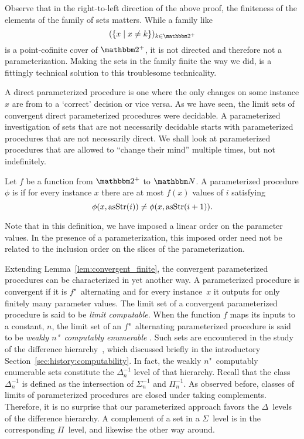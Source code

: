 Observe that in the right-to-left direction of the above proof, the finiteness of the elements of the family of sets matters.
While a family like
\begin{equation*}
  (\{x \st x \neq k\})_{k \in \binary^+}
\end{equation*}
is a point-cofinite cover of $\binary^+$, it is not directed and therefore not a parameterization.
Making the sets in the family finite the way we did, is a fittingly technical solution to this troublesome technicality.

A direct parameterized procedure is one where the only changes on some instance $x$ are from  to a `correct' decision or vice versa.
As we have seen, the limit sets of convergent direct parameterized procedures were decidable.
A parameterized investigation of sets that are not necessarily decidable starts with parameterized procedures that are not necessarily direct.
We shall look at parameterized procedures that are allowed to \enquote{change their mind} multiple times, but not indefinitely.
\begin{definition}
  Let $f$ be a function from $\binary^+$ to $\bbN$.
  A parameterized procedure $\phi$ is  if for every instance $x$ there are at most $f(x)$ values of $i$ satisfying
  \begin{equation*}
    \phi(x, \operatorname{asStr}(i)) \neq \phi(x, \operatorname{asStr}(i + 1)).
  \end{equation*}
\end{definition}

Note that in this definition, we have imposed a linear order on the parameter values.
In the presence of a parameterization, this imposed order need not be related to the inclusion order on the slices of the parameterization.

Extending Lemma~\ref{lem:convergent_finite}, the convergent parameterized procedures can be characterized in yet another way.
A parameterized procedure is convergent if it is $f$"~alternating and for every instance~$x$ it outputs  for only finitely many parameter values.
The limit set of a convergent parameterized procedure is said to be \emph{limit computable}.
When the function $f$ maps its inputs to a constant, $n$, the limit set of an $f$"~alternating parameterized procedure is said to be \emph{weakly $n$"~computably enumerable} \parencite{odifreddi1992classical,epstein1981hierarchies}.
Such sets are encountered in the study of the difference hierarchy~\parencite{downey2010algorithmic}, which discussed briefly in the introductory Section~\ref{sec:history:computability}.
In fact, the weakly $n$"~computably enumerable sets constitute the $\Delta^{-1}_n$ level of that hierarchy.
Recall that the class $\Delta^{-1}_n$ is defined as the intersection of $\Sigma^{-1}_n$ and $\Pi^{-1}_n$.
As observed before, classes of limits of parameterized procedures are closed under taking complements.
Therefore, it is no surprise that our parameterized approach favors the $\Delta$~levels of the difference hierarchy.
A complement of a set in a $\Sigma$~level is in the corresponding $\Pi$~level, and likewise the other way around.

